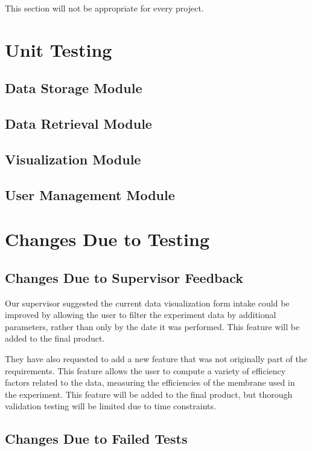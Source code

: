 \documentclass[12pt, titlepage]{article}
\begin{document}
This section will not be appropriate for every project.

\section{Unit Testing}

\subsection{Data Storage Module}
\subsection{Data Retrieval Module}
\subsection{Visualization Module}
\subsection{User Management Module}

\section{Changes Due to Testing}
\subsection{Changes Due to Supervisor Feedback}

Our supervisor suggested the current data visualization form intake could be
improved by allowing the user to filter the experiment data by additional
parameters, rather than only by the date it was performed. This feature will be
added to the final product.

They have also requested to add a new feature that was not originally part of
the requirements. This feature allows the user to compute a variety of
efficiency factors related to the data, measuring the efficiencies of the
membrane used in the experiment. This feature will be added to the final
product, but thorough validation testing will be limited due to time
constraints.



\subsection{Changes Due to Failed Tests}
\end{document}
